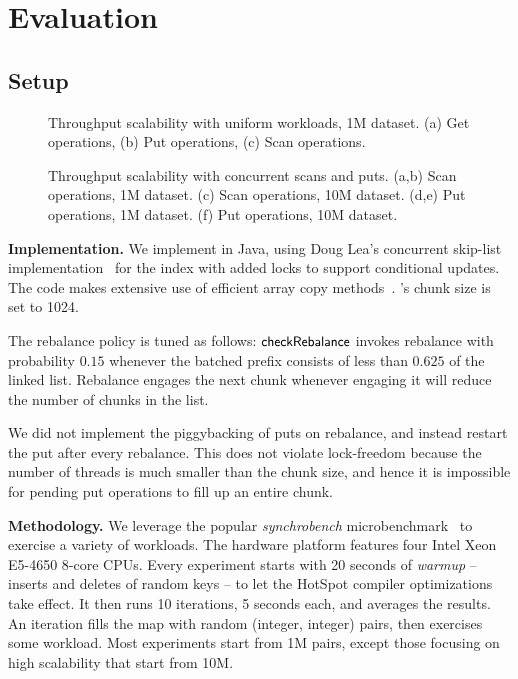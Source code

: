 \section{Evaluation}
\label{sec:eval}

\subsection{Setup}

\begin{figure*}
\begin{center}

\end{center}
\caption{Throughput scalability with uniform workloads, 1M dataset. (a) Get operations, (b) Put operations, (c) Scan operations. }
\label{evaluation:results:getputscan}
\end{figure*}

\begin{figure*}
\begin{center}

\end{center}
\caption{Throughput scalability with concurrent scans and puts. (a,b) Scan operations, 1M dataset. 
(c) Scan operations, 10M dataset. (d,e) Put operations, 1M dataset. (f) Put operations, 10M dataset.  }
\label{evaluation:results:scan}
\end{figure*}

{\bf Implementation.} We implement {\kiwi} in Java, using Doug Lea's concurrent skip-list 
implementation~\cite{JavaConcurrentSkipList} for the index with added locks to support conditional updates. 
The code makes extensive use of efficient 
array copy methods~\cite{JavaArrayCopy}. {\kiwi}'s chunk size is set to 1024. 

The rebalance policy is tuned as follows:
$\code{checkRebalance}$  invokes rebalance with probability $0.15$ whenever
 the batched prefix consists of less than $0.625$ of the linked list. Rebalance 
engages the next chunk whenever engaging it will reduce the number of chunks in the list. 

We did not implement the piggybacking of puts on rebalance, and instead restart the put after every rebalance.
This does not violate lock-freedom because the number of threads is much smaller than the chunk size, and 
hence it is impossible for pending put operations to fill up an entire chunk.

\textbf{Methodology.}
We leverage the popular {\em synchrobench}  microbenchmark~\cite{Gramoli2015}
to exercise a variety of workloads. The hardware platform %
features four Intel Xeon E5-4650 8-core CPUs. %
Every experiment starts with 20 seconds of {\em warmup} -- inserts
and deletes of random keys -- to let the HotSpot compiler optimizations take effect. 
It then runs 10  iterations, 5 seconds each, and averages the results. An iteration fills the map with 
random (integer, integer) pairs, then exercises some workload. 
{\color{red} Most experiments start from 1M pairs,
except those focusing on high scalability that start from 10M.}

